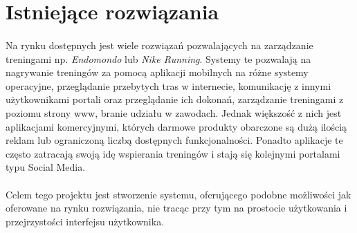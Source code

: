 \section{Istniejące rozwiązania}
\paragraph{}
Na rynku dostępnych jest wiele rozwiązań pozwalających na zarządzanie treningami np. \textit{Endomondo} lub \textit{Nike Running}. Systemy te pozwalają na nagrywanie treningów za pomocą aplikacji mobilnych na różne systemy operacyjne, przeglądanie przebytych tras w internecie, komunikację z innymi użytkownikami portali oraz przeglądanie ich dokonań, zarządzanie treningami z poziomu strony www, branie udziału w zawodach. Jednak większość z nich jest aplikacjami komercyjnymi, których darmowe produkty obarczone są dużą ilością reklam lub ograniczoną liczbą dostępnych funkcjonalności. Ponadto aplikacje te często zatracają swoją idę wspierania treningów i stają się kolejnymi portalami typu Social Media. 
\paragraph{} %
\label{par:}

Celem tego projektu jest stworzenie systemu, oferującego podobne możliwości jak oferowane na rynku rozwiązania, nie tracąc przy tym na prostocie użytkowania i przejrzystości interfejsu użytkownika.
